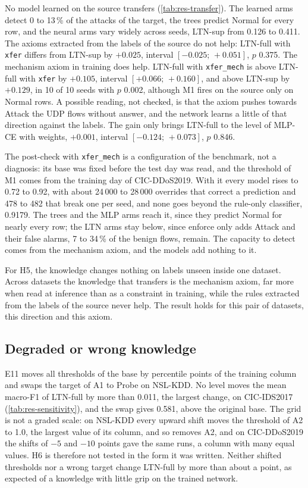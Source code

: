 No model learned on the source transfers (\cref{tab:res-transfer}). The learned arms detect 0 to 13\,\% of the
attacks of the target, the trees predict Normal for every row, and the neural arms vary widely across seeds, LTN-sup
from 0.126 to 0.411. The axioms extracted from the labels of the source do not help: LTN-full with \texttt{xfer}
differs from LTN-sup by $+0.025$, interval $[-0.025;\,+0.051]$, $p$ 0.375. The mechanism axiom in training does help.
LTN-full with \texttt{xfer\_mech} is above LTN-full with \texttt{xfer} by $+0.105$, interval $[+0.066;\,+0.160]$, and
above LTN-sup by $+0.129$, in 10 of 10 seeds with $p$ 0.002, although M1 fires on the source only on Normal rows. A
possible reading, not checked, is that the axiom pushes towards Attack the UDP flows without answer, and the network
learns a little of that direction against the labels. The gain only brings LTN-full to the level of MLP-CE with weights, $+0.001$,
interval $[-0.124;\,+0.073]$, $p$ 0.846.

The post-check with \texttt{xfer\_mech} is a configuration of the benchmark, not a diagnosis: its base was fixed
before the test day was read, and the threshold of M1 comes from the training day of CIC-DDoS2019. With it every model
rises to 0.72 to 0.92, with about 24\,000 to 28\,000 overrides that correct a prediction and 478 to 482 that break one
per seed, and none goes beyond the rule-only classifier, 0.9179. The trees and the MLP arms reach it, since they predict
Normal for nearly every row; the LTN arms stay below, since enforce only adds Attack and their false alarms, 7 to 34\,\%
of the benign flows, remain. The capacity to detect comes from the mechanism axiom, and the models add nothing to it.

For H5, the knowledge changes nothing on labels unseen inside one dataset. Across datasets the knowledge that transfers
is the mechanism axiom, far more when read at inference than as a constraint in training, while the rules extracted from
the labels of the source never help. The result holds for this pair of datasets, this direction and this axiom.

\subsection{Degraded or wrong knowledge}
\label{sec:res-degraded}

E11 moves all thresholds of the base by percentile points of the training column and swaps the target of A1 to Probe on
NSL-KDD. No level moves the mean macro-F1 of LTN-full by more than 0.011, the largest change, on CIC-IDS2017
(\cref{tab:res-sensitivity}), and the swap gives 0.581, above the original base. The grid is not a graded scale: on
NSL-KDD every upward shift moves the threshold of A2 to 1.0, the largest value of its column, and so removes A2, and on
CIC-DDoS2019 the shifts of $-5$ and $-10$ points gave the same runs, a column with many equal values. H6 is therefore not
tested in the form it was written. Neither shifted thresholds nor a wrong target change LTN-full by more than about a
point, as expected of a knowledge with little grip on the trained network.

